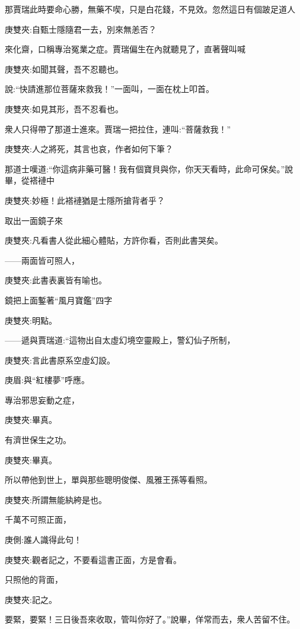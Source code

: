 \begin{parag}
    那賈瑞此時要命心勝，無藥不喫，只是白花錢，不見效。忽然這日有個跛足道人\begin{note}庚雙夾:自甄士隱隨君一去，別來無恙否？\end{note}來化齋，口稱專治冤業之症。賈瑞偏生在內就聽見了，直著聲叫喊\begin{note}庚雙夾:如聞其聲，吾不忍聽也。\end{note}說:“快請進那位菩薩來救我！”一面叫，一面在枕上叩首。\begin{note}庚雙夾:如見其形，吾不忍看也。\end{note}衆人只得帶了那道士進來。賈瑞一把拉住，連叫:“菩薩救我！”\begin{note}庚雙夾:人之將死，其言也哀，作者如何下筆？\end{note}那道士嘆道:“你這病非藥可醫！我有個寶貝與你，你天天看時，此命可保矣。”說畢，從褡褳中\begin{note}庚雙夾:妙極！此褡褳猶是士隱所搶背者乎？\end{note}取出一面鏡子來\begin{note}庚雙夾:凡看書人從此細心體貼，方許你看，否則此書哭矣。\end{note}——兩面皆可照人，\begin{note}庚雙夾:此書表裏皆有喻也。\end{note}鏡把上面鏨著“風月寶鑑”四字\begin{note}庚雙夾:明點。\end{note}——遞與賈瑞道:“這物出自太虛幻境空靈殿上，警幻仙子所制，\begin{note}庚雙夾:言此書原系空虛幻設。\end{note}\begin{note}庚眉:與“紅樓夢”呼應。\end{note}專治邪思妄動之症，\begin{note}庚雙夾:畢真。\end{note}有濟世保生之功。\begin{note}庚雙夾:畢真。\end{note}所以帶他到世上，單與那些聰明俊傑、風雅王孫等看照。\begin{note}庚雙夾:所謂無能紈絝是也。\end{note}千萬不可照正面，\begin{note}庚側:誰人識得此句！\end{note}\begin{note}庚雙夾:觀者記之，不要看這書正面，方是會看。\end{note}只照他的背面，\begin{note}庚雙夾:記之。\end{note}要緊，要緊！三日後吾來收取，管叫你好了。”說畢，佯常而去，衆人苦留不住。
\end{parag}



